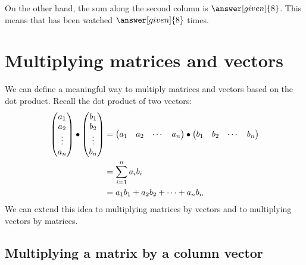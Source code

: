 \documentclass{ximera}
\begin{document}
\begin{example}
\begin{explanation}
    On the other hand, the sum along the second column is $\answer[given]{8}$. This
    means that  has been watched $\answer[given]{8}$ times.
  \end{explanation}
\end{example}





\section{Multiplying matrices and vectors}

We can define a meaningful way to multiply matrices and vectors based
on the dot product.  Recall the dot product of two vectors:
\begin{align*}
  \begin{pmatrix}
    a_1\\
    a_2\\
    \vdots\\
    a_n
  \end{pmatrix}
  \bullet
  \begin{pmatrix}
    b_1\\
    b_2\\
    \vdots\\
    b_n
  \end{pmatrix}
  &=\begin{pmatrix} a_1 & a_2 & \cdots & a_n\end{pmatrix}\bullet\begin{pmatrix} b_1 & b_2 & \cdots & b_n\end{pmatrix}\\
  &= \sum_{i=1}^n a_ib_i\\
  &= a_1b_1 + a_2b_2 +\dots+a_nb_n
\end{align*}
We can extend this idea to multiplying matrices by vectors and to
multiplying vectors by matrices.

\subsection{Multiplying a matrix by a column vector}
\end{document}
